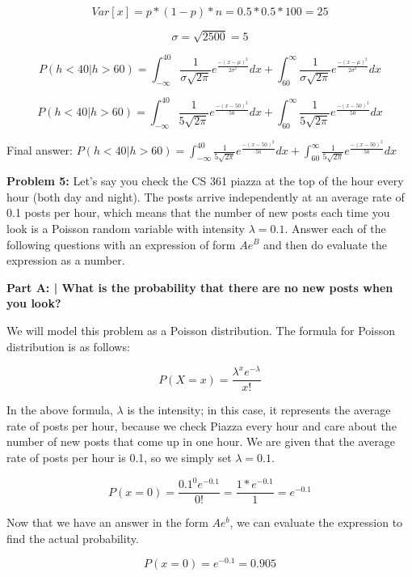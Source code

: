 \documentclass{article}
\begin{document}
 \[Var[x] = p*(1-p)*n = 0.5*0.5*100 = 25\]
 
 \[\sigma = \sqrt{2500} = 5 \]
 
 \[ P(h < 40 | h > 60) = \int_{-\infty}^{40}\frac{1}{\sigma\sqrt{2\pi}}e^\frac{-(x-\mu)^2}{2\sigma^2}dx+
 \int_{60}^{\infty}\frac{1}{\sigma\sqrt{2\pi}}e^\frac{-(x-\mu)^2}{2\sigma^2}dx\]
 
 \[ P(h < 40 | h > 60) = \int_{-\infty}^{40}\frac{1}{5\sqrt{2\pi}}e^\frac{-(x-50)^2}{50}dx+
 \int_{60}^{\infty}\frac{1}{5\sqrt{2\pi}}e^\frac{-(x-50)^2}{50}dx\]
 
 Final answer: $P(h < 40 | h > 60) = \int_{-\infty}^{40}\frac{1}{5\sqrt{2\pi}}e^\frac{-(x-50)^2}{50}dx+
 \int_{60}^{\infty}\frac{1}{5\sqrt{2\pi}}e^\frac{-(x-50)^2}{50}dx$\newline
 
 \newpage
 
 \begin{center}
    \Large\textbf{Problem 5:} Let's say you check the CS 361 piazza at the top of the hour every hour (both day and night). The posts arrive independently at an average rate of 0.1 posts per hour, which means that the number of new posts each time you look is a Poisson random variable with intensity $\lambda=0.1$. Answer each of the following questions with an expression of form $Ae^B$ and then do evaluate the expression as a number.\par
 \end{center}
 
 \textbf{Part A: | What is the probability that there are no new posts when you look?}\newline
 
 We will model this problem as a Poisson distribution. The formula for Poisson distribution is as follows:
 
 \[P(X=x) = \frac{\lambda^xe^{-\lambda}}{x!}\]
 
 In the above formula, $\lambda$ is the intensity; in this case, it represents the average rate of posts per hour, because we check Piazza every hour and care about the number of new posts that come up in one hour. We are given that the average rate of posts per hour is 0.1, so we simply set $\lambda = 0.1$.
 
 \[P(x=0) = \frac{0.1^0e^{-0.1}}{0!} = \frac{1*e^{-0.1}}{1} = e^{-0.1}\]
 
 Now that we have an answer in the form $Ae^b$, we can evaluate the expression to find the actual probability.
 
 \[P(x=0) = e^{-0.1} = 0.905\]
 
\end{document}
